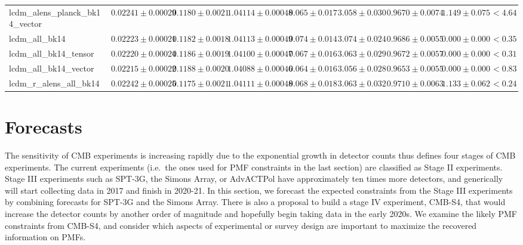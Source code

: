 \documentclass[preprint]{emulateapj}
\begin{document}
\begin{table*}[h]
\begin{center}
\begin{tabular}{l || c c c c c c c | c}
lcdm\_alens\_planck\_bk14\_vector & $ 0.02241\pm  0.00029$ & $ 0.1180\pm  0.0021$ & $ 1.04114\pm  0.00048$ & $ 0.065\pm  0.017$ & $ 3.058\pm  0.030$ & $ 0.9670\pm  0.0074$ & $ 1.149 \pm  0.075$ & $< 4.64$ \\
lcdm\_all\_bk14 & $ 0.02223\pm  0.00021$ & $ 0.1182\pm  0.0018$ & $ 1.04113\pm  0.00049$ & $ 0.074\pm  0.014$ & $ 3.074\pm  0.024$ & $ 0.9686\pm  0.0055$ & $ 0.000 \pm  0.000$ & $< 0.35$ \\
lcdm\_all\_bk14\_tensor & $ 0.02220\pm  0.00024$ & $ 0.1186\pm  0.0019$ & $ 1.04100\pm  0.00047$ & $ 0.067\pm  0.016$ & $ 3.063\pm  0.029$ & $ 0.9672\pm  0.0057$ & $ 0.000 \pm  0.000$ & $< 0.31$ \\
lcdm\_all\_bk14\_vector & $ 0.02215\pm  0.00022$ & $ 0.1188\pm  0.0020$ & $ 1.04088\pm  0.00046$ & $ 0.064\pm  0.016$ & $ 3.056\pm  0.028$ & $ 0.9653\pm  0.0055$ & $ 0.000 \pm  0.000$ & $< 0.83$ \\
lcdm\_r\_alens\_all\_bk14 & $ 0.02242\pm  0.00025$ & $ 0.1175\pm  0.0021$ & $ 1.04111\pm  0.00048$ & $ 0.068\pm  0.018$ & $ 3.063\pm  0.032$ & $ 0.9710\pm  0.0063$ & $ 1.133 \pm  0.062$ & $< 0.24$ \\
\end{tabular}
 \normalsize
\end{center}
\end{table*}


\section{Forecasts}
\label{sec:forecasts}

The sensitivity of CMB experiments is increasing rapidly due to the exponential growth in detector counts
\citet{s4sciencebook} thus defines four stages of CMB experiments. 
The current experiments (i.e.~the ones used for PMF constraints in the last section) are classified as Stage II experiments. 
Stage III experiments such as SPT-3G, the Simons Array, or AdvACTPol \citep{spt3g,simonsarray,advactpol} have approximately ten times more detectors, and generically will start collecting data in 2017 and finish in 2020-21.
In this section, we forecast the expected constraints from the Stage III experiments by combining forecasts for SPT-3G and the Simons Array. 
There is also a proposal to build a stage IV experiment, CMB-S4,  that would increase the detector counts by another order of magnitude and hopefully begin taking data in the early 2020s.
We examine the likely PMF constraints from CMB-S4, and consider which aspects of experimental or survey design are important to maximize the recovered information on PMFs.
\end{document}

